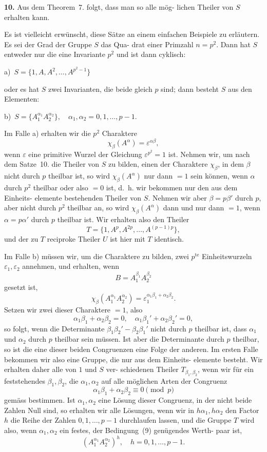 \documentclass[12pt,a4paper]{article}
\theoremstyle{plain}
\theoremstyle{definition}
\theoremstyle{remark}
\begin{document}
\textbf{10.} Aus dem Theorem~7. folgt, dass man so alle mög-
lichen Theiler von $S$ erhalten kann.


Es ist vielleicht erwünscht, diese Sätze an einem einfachen
Beispiele zu erläutern. Es sei der Grad der Gruppe $S$ das Qua-
drat einer Primzahl $n = p^2$. Dann hat $S$ entweder nur die eine
Invariante $p^2$ und ist dann cyklisch:

a)\ $S = \{1, A, A^2, \ldots, A^{p^2-1}\}$

oder es hat $S$ zwei Invarianten, die beide gleich $p$ sind; dann
besteht $S$ aus den Elementen:

b)\ $S = \{A_1^{\alpha_1} A_2^{\alpha_2}\}, \quad \alpha_1, \alpha_2 = 0, 1, \ldots, p-1$.

Im Falle a) erhalten wir die $p^2$ Charaktere
\[
\chi_\beta(A^\alpha) = \varepsilon^{\alpha\beta},
\]
wenn $\varepsilon$ eine primitive Wurzel der Gleichung $\varepsilon^{p^2} = 1$ ist. Nehmen
wir, um nach dem Satze~10. die Theiler von $S$ zu bilden, einen
der Charaktere $\chi_\beta$, in dem $\beta$ nicht durch $p$ theilbar ist, so wird
$\chi_\beta(A^\alpha)$ nur dann $= 1$ sein können, wenn $\alpha$ durch $p^2$ theilbar
oder also $= 0$ ist, d.~h. wir bekommen nur den aus dem Einheits-
elemente bestehenden Theiler von $S$. Nehmen wir aber $\beta = p\beta'$
durch $p$, aber nicht durch $p^2$ theilbar an, so wird $\chi_\beta(A^\alpha)$ dann
und nur dann $= 1$, wenn $\alpha = p\alpha'$ durch $p$ theilbar ist. Wir
erhalten also den Theiler
\[
T = \{1, A^p, A^{2p}, \ldots, A^{(p-1)p}\},
\]
und der zu $T$ reciproke Theiler $U$ ist hier mit $T$ identisch.

Im Falle b) müssen wir, um die Charaktere zu bilden, zwei
$p^{\text{te}}$ Einheitswurzeln $\varepsilon_1, \varepsilon_2$ annehmen, und erhalten, wenn
\[
B = A_1^{\beta_1} A_2^{\beta_2}
\]
gesetzt ist,
\[
\chi_\beta(A_1^{\alpha_1} A_2^{\alpha_2}) = \varepsilon_1^{\alpha_1 \beta_1 + \alpha_2 \beta_2}.
\]
Setzen wir zwei dieser Charaktere $= 1$, also
\[
\alpha_1 \beta_1 + \alpha_2 \beta_2 = 0, \quad \alpha_1 \beta_1' + \alpha_2 \beta_2' = 0,
\]
so folgt, wenn die Determinante $\beta_1 \beta_2' - \beta_2 \beta_1'$ nicht durch $p$
theilbar ist, dass $\alpha_1$ und $\alpha_2$ durch $p$ theilbar sein müssen. Ist
aber die Determinante durch $p$ theilbar, so ist die eine dieser
beiden Congruenzen eine Folge der anderen. Im ersten Falle
bekommen wir also eine Gruppe, die nur aus dem Einheits-
elemente besteht. Wir erhalten daher alle von $1$ und $S$ ver-
schiedenen Theiler $T_{\beta_1, \beta_2}$, wenn wir für ein feststehendes $\beta_1, \beta_2$,
die $\alpha_1, \alpha_2$ auf alle möglichen Arten der Congruenz
\begin{equation}\tag{9}
\alpha_1 \beta_1 + \alpha_2 \beta_2 \equiv 0 \pmod{p}
\end{equation}
gemäss bestimmen. Ist $\alpha_1, \alpha_2$ eine Lösung dieser Congruenz, in
der nicht beide Zahlen Null sind, so erhalten wir alle Lösungen,
wenn wir in $h\alpha_1, h\alpha_2$ den Factor $h$ die Reihe der Zahlen
$0, 1, \ldots, p-1$ durchlaufen lassen, und die Gruppe $T$ wird also,
wenn $\alpha_1, \alpha_2$ ein festes, der Bedingung~(9) genügendes Werth-
paar ist,
\[
(A_1^{\alpha_1} A_2^{\alpha_2})^h, \quad h = 0, 1, \ldots, p-1.
\]
\end{document}
